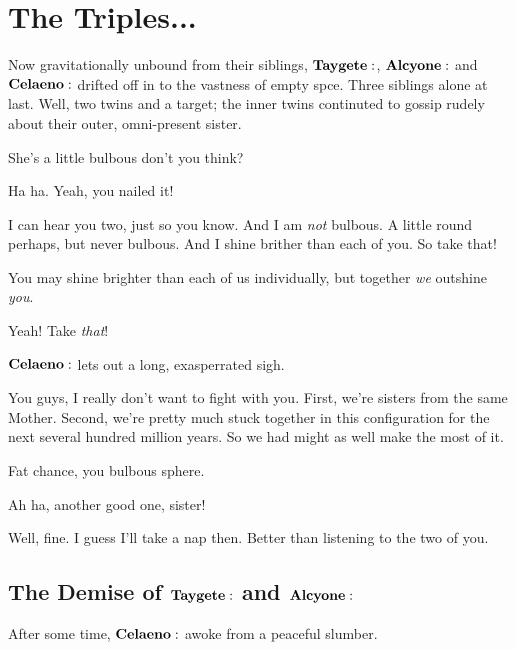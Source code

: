 \section{The Triples...}

 
Now gravitationally unbound from their siblings, $\Taygete$, $\Alcyone$ and $\Celaeno$ drifted off in to the vastness of empty spce.  Three siblings alone at last.  Well, two twins and a target; the inner twins continuted to gossip rudely about their outer, omni-present sister.

\Taygete She's a little bulbous don't you think?

\Alcyone  Ha ha.  Yeah, you nailed it!

\Celaeno  I can hear you two, just so you know.  And I am \textit{not} bulbous.  A little round perhaps, but never bulbous.  And I shine brither than each of you.  So take that!

\Alcyone You may shine brighter than each of us individually, but together \textit{we} outshine \textit{you}.  

\Taygete Yeah!  Take \textit{that}!

$\Celaeno$ lets out a long, exasperrated sigh.

\Celaeno You guys, I really don't want to fight with you.  First, we're sisters from the same Mother.  Second, we're pretty much stuck together in this configuration for the next several hundred million years.  So we had might as well make the most of it.

\Taygete Fat chance, you bulbous sphere.

\Alcyone Ah ha, another good one, sister!

\Celaeno Well, fine.  I guess I'll take a nap then.  Better than listening to the two of you.

\subsection{The Demise of $\Taygete$ and $\Alcyone$}

After some time, $\Celaeno$ awoke from a peaceful slumber.  

